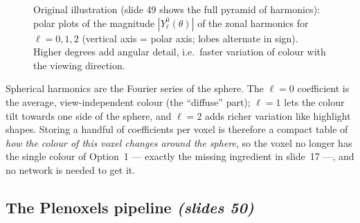 \documentclass[11pt,a4paper]{article}
\newcommand{\sref}[1]{\texorpdfstring{\emph{(slides #1)}}{(slides #1)}}
\theoremstyle{definition}
\theoremstyle{plain}
\begin{document}
\begin{figure}[H]
\centering
{}
\caption{Original illustration (slide 49 shows the full pyramid of harmonics): polar plots of the magnitude $|Y_\ell^0(\theta)|$ of the zonal harmonics for $\ell=0,1,2$ (vertical axis = polar axis; lobes alternate in sign). Higher degrees add angular detail, i.e.\ faster variation of colour with the viewing direction.}
\end{figure}

\begin{intuition}
Spherical harmonics are the Fourier series of the sphere. The $\ell=0$ coefficient is the average, view-independent colour (the ``diffuse'' part); $\ell=1$ lets the colour tilt towards one side of the sphere, and $\ell=2$ adds richer variation like highlight shapes. Storing a handful of coefficients per voxel is therefore a compact table of \emph{how the colour of this voxel changes around the sphere}, so the voxel no longer has the single colour of Option~1 --- exactly the missing ingredient in slide~17 ---, and no network is needed to get it.
\end{intuition}

\subsection{The Plenoxels pipeline \sref{50}}
\end{document}
